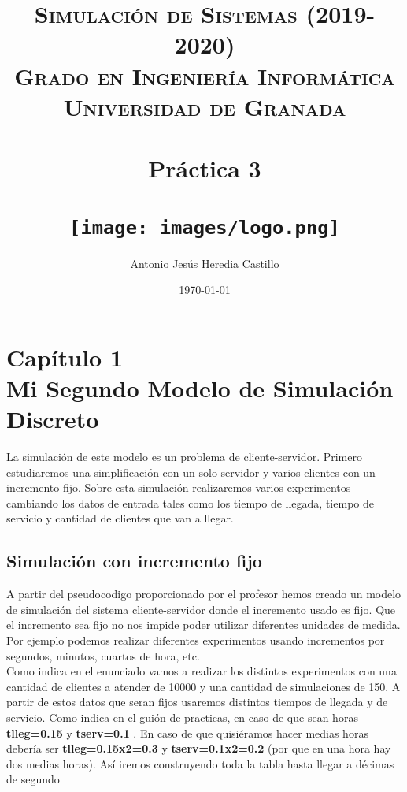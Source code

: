 \documentclass[12pt,a4paper]{article}
\title{
\normalfont \normalsize 
\textsc{{\bf Simulación de Sistemas (2019-2020)} \\ Grado en Ingeniería Informática \\ Universidad de Granada} \\ [25pt] %
\horrule{0.5pt} \\[0.4cm] %
\huge Práctica 3 \\ %
\horrule{2pt} \\[0.5cm] %
\texttt{[image: images/logo.png]}	
}
\author{Antonio Jesús Heredia Castillo} %
\date{\normalsize\today} %
\begin{document}
\maketitle %

\newpage
\tableofcontents %
\newpage %
\listoffigures
\newpage

\section[Capítulo 1: Mi segundo modelo de simulación discreto]{Capítulo 1\\{\large Mi Segundo Modelo de Simulación Discreto}}
La simulación de este modelo es un problema de cliente-servidor. Primero estudiaremos una simplificación con un solo servidor y varios clientes con un incremento fijo. Sobre esta simulación realizaremos varios experimentos cambiando los datos de entrada tales como los tiempo de llegada, tiempo de servicio y cantidad de clientes que van a llegar. 
\subsection{Simulación con incremento fijo}
A partir del pseudocodigo proporcionado por el profesor hemos creado un modelo de simulación del sistema cliente-servidor donde el incremento usado es fijo. Que el incremento sea fijo no nos impide poder utilizar diferentes unidades de medida. Por ejemplo podemos realizar diferentes experimentos usando incrementos por segundos, minutos, cuartos de hora, etc. \\
Como indica en el enunciado vamos a realizar los distintos experimentos con una cantidad de clientes a atender de 10000 y una cantidad de simulaciones de 150. A partir de estos datos que seran fijos usaremos distintos tiempos de llegada y de servicio. Como indica en el guión de practicas, en caso de que sean horas \textbf{tlleg=0.15} y \textbf{tserv=0.1} . En caso de que quisiéramos hacer medias horas debería ser \textbf{tlleg=0.15x2=0.3} y  \textbf{tserv=0.1x2=0.2} (por que en una hora hay dos medias horas). Así iremos construyendo toda la tabla hasta llegar a décimas de segundo
\end{document}

